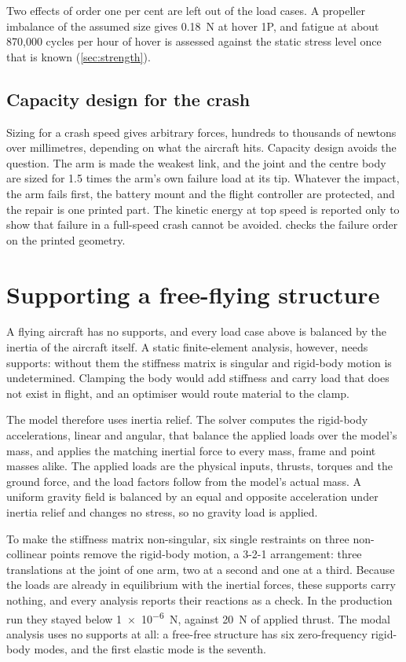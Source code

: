 Two effects of order one per cent are left out of the load cases. A propeller imbalance of the assumed size gives \SI{0.18}{N} at hover 1P, and fatigue at about 870,000 cycles per hour of hover is assessed against the static stress level once that is known (\cref{sec:strength}).

\subsection{Capacity design for the crash}\label{sec:loads-capacity}

Sizing for a crash speed gives arbitrary forces, hundreds to thousands of newtons over millimetres, depending on what the aircraft hits. Capacity design avoids the question. The arm is made the weakest link, and the joint and the centre body are sized for 1.5 times the arm's own failure load at its tip. Whatever the impact, the arm fails first, the battery mount and the flight controller are protected, and the repair is one printed part. The kinetic energy at top speed is reported only to show that failure in a full-speed crash cannot be avoided.  checks the failure order on the printed geometry.

\section{Supporting a free-flying structure}\label{sec:loads-supports}

A flying aircraft has no supports, and every load case above is balanced by the inertia of the aircraft itself. A static finite-element analysis, however, needs supports: without them the stiffness matrix is singular and rigid-body motion is undetermined. Clamping the body would add stiffness and carry load that does not exist in flight, and an optimiser would route material to the clamp.

The model therefore uses inertia relief. The solver computes the rigid-body accelerations, linear and angular, that balance the applied loads over the model's mass, and applies the matching inertial force to every mass, frame and point masses alike. The applied loads are the physical inputs, thrusts, torques and the ground force, and the load factors follow from the model's actual mass. A uniform gravity field is balanced by an equal and opposite acceleration under inertia relief and changes no stress, so no gravity load is applied.

To make the stiffness matrix non-singular, six single restraints on three non-collinear points remove the rigid-body motion, a 3-2-1 arrangement: three translations at the joint of one arm, two at a second and one at a third. Because the loads are already in equilibrium with the inertial forces, these supports carry nothing, and every analysis reports their reactions as a check. In the production run they stayed below \SI{1e-6}{N}, against \SI{20}{N} of applied thrust. The modal analysis uses no supports at all: a free-free structure has six zero-frequency rigid-body modes, and the first elastic mode is the seventh.

